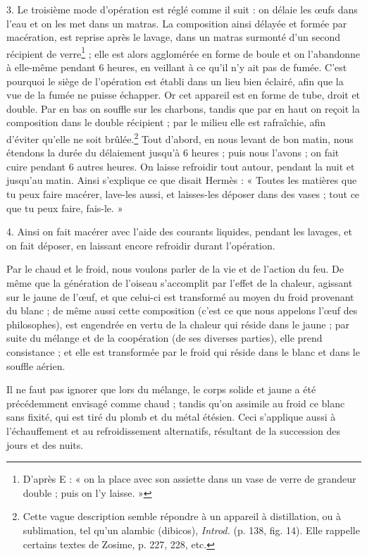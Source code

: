 \documentclass[a4paper, 11pt, oneside, polutonikogreek, french]{article}
\begin{document}
3. Le troisième mode d'opération est réglé comme il suit : on délaie les œufs dans l'eau et on les met dans un matras. La composition ainsi délayée et formée par macération, est reprise après le lavage, dans un matras surmonté d'un second récipient de verre\footnote{D'après E : « on la place avec son assiette dans un vase de verre de grandeur double ; puis on l'y laisse. »} ; elle est alors agglomérée en forme de boule et on l'abandonne à elle-même pendant 6 heures, en veillant à ce qu'il n'y ait pas de fumée. C'est pourquoi le siège de l'opération est établi dans un lieu bien éclairé, afin que la vue de la fumée ne puisse échapper. Or cet appareil est en forme de tube, droit et double. Par en bas on souffle sur les charbons, tandis que par en haut on reçoit la composition dans le double récipient ; par le milieu elle est rafraîchie, afin d'éviter qu'elle ne soit brûlée.\footnote{Cette vague description semble répondre à un appareil à distillation, ou à sublimation, tel qu'un alambic (dibicos), \emph{Introd.} (p. 138, fig. 14). Elle rappelle certains textes de Zosime, p. 227, 228, etc.} Tout d'abord, en nous levant de bon matin, nous étendons la durée du délaiement jusqu'à 6 heures ; puis nous l'avons ; on fait cuire pendant 6 autres heures. On laisse refroidir tout autour, pendant la nuit et jusqu'au matin. Ainsi s'explique ce que disait Hermès : « Toutes les matières que tu peux faire macérer, lave-les aussi, et laisses-les déposer dans des vases ; tout ce que tu peux faire, fais-le. »

4. Ainsi on fait macérer avec l'aide des courants liquides, pendant les lavages, et on fait déposer, en laissant encore refroidir durant l'opération.

Par le chaud et le froid, nous voulons parler de la vie et de l'action du feu. De même que la génération de l'oiseau s'accomplit par l'effet de la chaleur, agissant sur le jaune de l'œuf, et que celui-ci est transformé au moyen du froid provenant du blanc ; de même aussi cette composition (c'est ce que nous appelons l'œuf des philosophes), est engendrée en vertu de la chaleur qui réside dans le jaune ; par suite du mélange et de la coopération (de ses diverses parties), elle prend consistance ; et elle est transformée par le froid qui réside dans le blanc et dans le souffle aérien.

Il ne faut pas ignorer que lors du mélange, le corps solide et jaune a été précédemment envisagé comme chaud ; tandis qu'on assimile au froid ce blanc sans fixité, qui est tiré du plomb et du métal étésien. Ceci s'applique aussi à l'échauffement et au refroidissement alternatifs, résultant de la succession des jours et des nuits.
\end{document}
